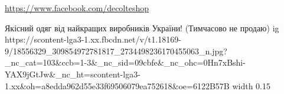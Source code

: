  
 
 
 
 

\url{https://www.facebook.com/decolteshop}\par
Якісний одяг від найкращих виробників України!
(Тимчасово не продаю)
\ifcmt
  ig https://scontent-lga3-1.xx.fbcdn.net/v/t1.18169-9/18556329_309854972781817_2734498236170455063_n.jpg?_nc_cat=103&ccb=1-3&_nc_sid=09cbfe&_nc_ohc=0Hn7xBshi-YAX9jGtJw&_nc_ht=scontent-lga3-1.xx&oh=a8edda962d55e33f69506079ea752618&oe=6122B57B
  width 0.15
\fi
